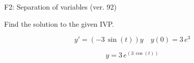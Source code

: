 \begin{exercise}
  \begin{exerciseTitle}F2: Separation of variables (ver. 92)\end{exerciseTitle}
  \begin{exerciseStatement}
    
Find the solution to the given IVP.

    
\[y'=( -3 \, \sin\left(t\right) )y\hspace{1em} y(0)= 3 \, e^{3}\]

  \end{exerciseStatement}
  \begin{exerciseAnswer}
    
\[y= 3 \, e^{\left(3 \, \cos\left(t\right)\right)}\]

  \end{exerciseAnswer}
\end{exercise}